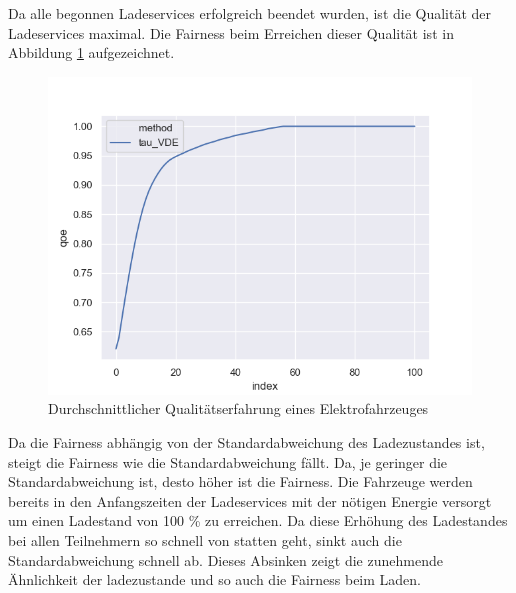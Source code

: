 Da alle begonnen Ladeservices erfolgreich beendet wurden, ist die Qualität der Ladeservices maximal. Die Fairness beim Erreichen dieser Qualität ist in Abbildung \ref{Abb_VDEtauFairness} aufgezeichnet. \\
\begin{figure}[htb]
\centering
	\includegraphics[scale=0.4]{img/VDE_tau/tau_VDE_2_qoe.png}
	\caption{Durchschnittlicher Qualitätserfahrung eines Elektrofahrzeuges}
	\label{Abb_VDEtauFairness}
\end{figure}

Da die Fairness abhängig von der Standardabweichung des Ladezustandes ist, steigt die Fairness wie die Standardabweichung fällt. Da, je geringer die Standardabweichung ist, desto höher ist die Fairness. Die Fahrzeuge werden bereits in den Anfangszeiten der Ladeservices mit der nötigen Energie versorgt um einen Ladestand von 100 \% zu erreichen. Da diese Erhöhung des Ladestandes bei allen Teilnehmern so schnell von statten geht, sinkt auch die Standardabweichung schnell ab. Dieses Absinken zeigt die zunehmende Ähnlichkeit der ladezustande und so auch die Fairness beim Laden.

